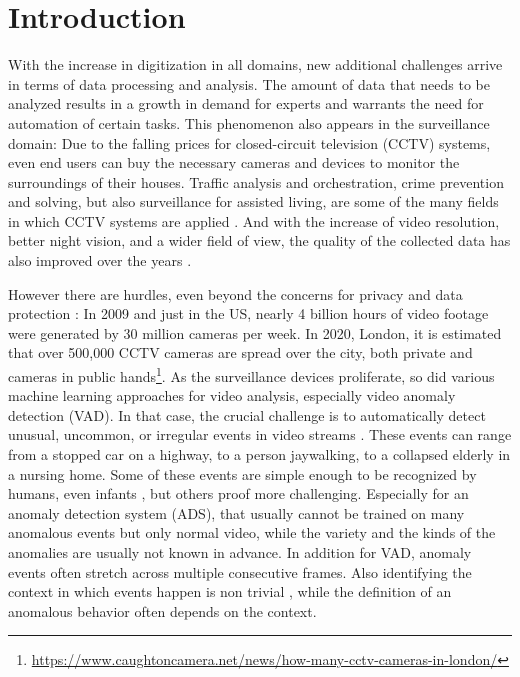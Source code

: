 \chapter{Introduction} \label{chap:introduction} %

With the increase in digitization in all domains, new additional challenges arrive in terms of data processing and analysis. The amount of data that needs to be analyzed results in a growth in demand for experts and warrants the need for automation of certain tasks. This phenomenon also appears in the surveillance domain: Due to the falling prices for closed-circuit television (CCTV) systems, even end users can buy the necessary cameras and devices to monitor the surroundings of their houses. Traffic analysis and orchestration, crime prevention and solving, but also surveillance for assisted living, are some of the many fields in which CCTV systems are applied \cite{fleck2010privacy, bruce2001matching}. And with the increase of video resolution, better night vision, and a wider field of view, the quality of the collected data has also improved over the years \cite{kruegle2011cctv}. 

However there are hurdles, even beyond the concerns for privacy and data protection \cite{vlahos2009surveillance}: In 2009 and just in the US, nearly 4 billion hours of video footage were generated by 30 million cameras per week. In 2020, London, it is estimated that over 500,000 CCTV cameras are spread over the city, both private and cameras in public hands\footnote{\url{https://www.caughtoncamera.net/news/how-many-cctv-cameras-in-london/}}. As the surveillance devices proliferate, so did various machine learning approaches for video analysis, especially video anomaly detection (VAD). In that case, the crucial challenge is to automatically detect unusual, uncommon, or irregular events in video streams \cite{xiang2008video, saligrama2012video, xu2017detecting}. These events can range from a stopped car on a highway, to a person jaywalking, to a collapsed elderly in a nursing home. Some of these events are simple enough to be recognized by humans, even infants \cite{woodward2009infants}, but others proof more challenging. Especially for an anomaly detection system (ADS), that usually cannot be trained on many anomalous events but only normal video, while the variety and the kinds of the anomalies are usually not known in advance. In addition for VAD, anomaly events often stretch across multiple consecutive frames. Also identifying the context in which events happen is non trivial \cite{liu2020enhancing}, while the definition of an anomalous behavior often depends on the context. 


